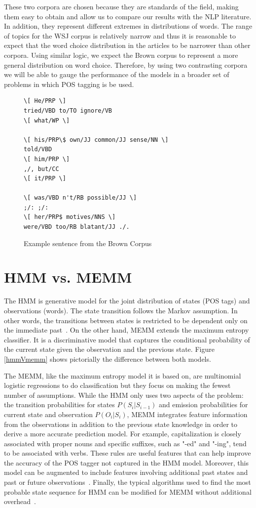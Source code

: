 \documentclass{acm_proc_article-sp}
\begin{document}
These two corpora are chosen because they are standards of the field, making them easy to obtain and allow us to compare our results with the NLP literature. In addition, they represent different extremes in distributions of words. The range of topics for the WSJ corpus is relatively narrow and thus it is reasonable to expect that the word choice distribution in the articles to be narrower than other corpora. Using similar logic, we expect the Brown corpus to represent a more general distribution on word choice. Therefore, by using two contrasting corpora we will be able to gauge the performance of the models in a broader set of problems in which POS tagging is be used.

\begin{figure}[ht]
 \begin{Verbatim}[frame=single,framesep=5mm]
\[ He/PRP \]
tried/VBD to/TO ignore/VB
\[ what/WP \]

\[ his/PRP\$ own/JJ common/JJ sense/NN \]
told/VBD
\[ him/PRP \]
,/, but/CC
\[ it/PRP \]

\[ was/VBD n't/RB possible/JJ \]
;/: ;/:
\[ her/PRP$ motives/NNS \]
were/VBD too/RB blatant/JJ ./.
\end{Verbatim}
\caption{Example sentence from the Brown Corpus~\cite{brownCorpus} \label{brownExample}}
\end{figure}

\section{HMM vs. MEMM}
The HMM is generative model for the joint distribution of states (POS tags) and observations (words). The state transition follows the Markov assumption. In other words, the transitions between states is restricted to be dependent only on the immediate past~\cite{nlpBook}. On the other hand, MEMM extends the maximum entropy classifier. It is a discriminative model that captures the conditional probability of the current state given the observation and the previous state. Figure \ref{hmmVmemm} shows pictorially the difference between both models.

The MEMM, like the maximum entropy model it is based on, are multinomial logistic regressions to do classification but they focus on making the fewest number of assumptions. While the HMM only uses two aspects of the problem: the transition probabilities for states $P( S_i | S_{i-1} )$ and emission probabilities for current state and observation $P( O_i | S_i )$, MEMM integrates feature information from the observations in addition to the previous state knowledge in order to derive a more accurate prediction model. For example, capitalization is closely associated with proper nouns and specific suffixes, such as "-ed" and "-ing", tend to be associated with verbs. These rules are useful features that can help improve the accuracy of the POS tagger not captured in the HMM model. Moreover, this model can be augmented to include features involving additional past states and past or future observations~\cite{nlpBook}. Finally, the typical algorithms used to find the most probable state sequence for HMM can be modified for MEMM without additional overhead~\cite{memmPaper}.
\end{document}
